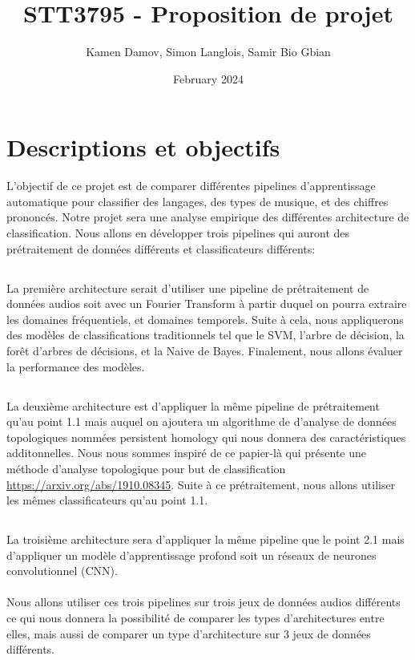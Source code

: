 \documentclass{article}
\title{STT3795 - Proposition de projet}
\author{Kamen Damov, Simon Langlois, Samir Bio Gbian}
\date{February 2024}
\begin{document}
\maketitle

\section{Descriptions et objectifs}
L'objectif de ce projet est de comparer différentes pipelines d'apprentissage automatique pour classifier des langages, des types de musique, et des chiffres prononcés. Notre projet sera une analyse empirique des différentes architecture de classification. Nous allons en développer trois pipelines qui auront des prétraitement de données différents et classificateurs différents:
\subsection{}
La première architecture serait d'utiliser une pipeline de prétraitement de données audios soit avec un Fourier Transform à partir duquel on pourra extraire les domaines fréquentiels, et domaines temporels. Suite à cela, nous appliquerons des modèles de classifications traditionnels tel que le SVM, l'arbre de décision, la forêt d'arbres de décisions, et la Naive de Bayes. Finalement, nous allons évaluer la performance des modèles. 
\subsection{}
La deuxième architecture est d'appliquer la même pipeline de prétraitement qu'au point 1.1 mais auquel on ajoutera un algorithme de d'analyse de données topologiques nommées persistent homology qui nous donnera des caractéristiques additonnelles. Nous nous sommes inspiré de ce papier-là qui présente une méthode d'analyse topologique pour but de classification \url{https://arxiv.org/abs/1910.08345}. Suite à ce prétraitement, nous allons utiliser les mêmes classificateurs qu'au point 1.1.
\subsection{}
La troisième architecture sera d'appliquer la même pipeline que le point 2.1 mais d'appliquer un modèle d'apprentissage profond soit un réseaux de neurones convolutionnel (CNN).\\\\
Nous allons utiliser ces trois pipelines sur trois jeux de données audios différents ce qui nous donnera la possibilité de comparer les types d'architectures entre elles, mais aussi de comparer un type d'architecture sur 3 jeux de données différents. 
\end{document}
